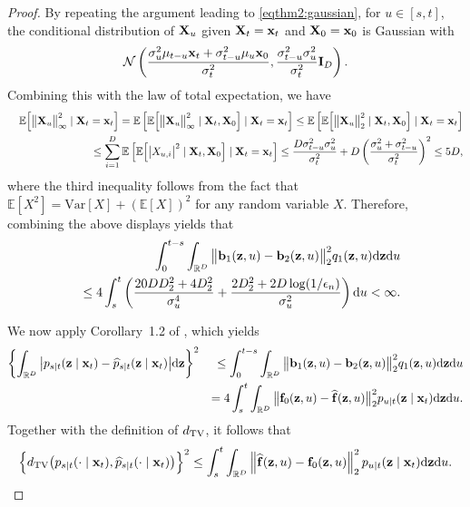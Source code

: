 \documentclass[11pt,a4paper,final]{article}
\numberwithin{equation}{section}
\theoremstyle{remark}
\def\cN{\mathcal N}
\newcommand{\bb}{{\bf b}}
\newcommand{\bff}{{\bf f}}
\newcommand{\bI}{{\bf I}}
\newcommand{\bx}{{\bf x}}
\newcommand{\bX}{{\bf X}}
\newcommand{\bz}{{\bf z}}
\newcommand{\bbE}{{\mathbb E}}
\newcommand{\bbR}{{\mathbb R}}
\newcommand{\bean}{\setlength\arraycolsep{1pt}\begin{eqnarray*}}
\newcommand{\eean}{\end{eqnarray*}}
\def\d{{\rm d}}
\begin{document}
\begin{proof}
By repeating the argument leading to \eqref{eqthm2:gaussian}, for $u \in [s,t]$, the conditional distribution of $\bX_{u}$ given $\bX_{t} = \bx_{t}$ and $\bX_{0} = \bx_{0}$ is Gaussian with  
\bean
\cN
\left( \frac{ \sigma_{u}^2 \mu_{t-u} \bx_{t} + \sigma_{t-u}^2 \mu_{u} \bx_{0 } }{\sigma_{t}^2}  , \frac{ \sigma_{t-u}^2 \sigma_{u}^2 }{\sigma_{t}^2} \bI_{D}
\right).
\eean
Combining this with the law of total expectation, we have
\bean
&& \bbE \Big[
\big\|  \bX_{u} \big\|_{\infty}^2 \mid \bX_{t} = \bx_{t} \Big]
=
\bbE \left[ \bbE \Big[
\big\|  \bX_{u} \big\|_{\infty}^2 \mid \bX_{t}, \bX_{0} \Big] \mid \bX_{t} = \bx_{t} \right]
\leq \bbE \left[ \bbE \Big[
\big\|  \bX_{u} \big\|_{2}^2 \mid \bX_{t}, \bX_{0} \Big] \mid \bX_{t} = \bx_{t} \right]
\\
&& \leq \sum_{i=1}^{D} \bbE \left[ \bbE \Big[
\big\vert  X_{u,i} \big\vert^2 \mid \bX_{t}, \bX_{0} \Big] \mid \bX_{t} = \bx_{t} \right]
\leq \frac{ D \sigma_{t-u}^2 \sigma_{u}^2 }{\sigma_{t}^2} + D \left( \frac{ \sigma_{u}^2 + \sigma_{t-u}^2 }{\sigma_{t}^2}  \right)^2 \leq 5D,
\eean
where the third inequality follows from the fact that $\bbE[ X^2] = \text{Var}[X] + ( \bbE[X] )^2$ for any random variable $X$.
Therefore, combining the above displays yields that
\bean
&& \int_{0}^{t-s}
\int_{\bbR^{D}} 
\big\| \bb_{1}(\bz,u) - \bb_{2}(\bz,u) \big\|_2^2 q_1(\bz,u)
\d \bz \d u
\\
&& \leq 4 \int_{s}^{t} \left( \frac{20 D D_{2}^2 + 4 D_{2}^2   }{\sigma_{u}^4}  + \frac{2 D_{2}^2 + 2 D \log (1/\epsilon_n) }{\sigma_{u}^2} \right) \d u < \infty.
\eean

We now apply Corollary~1.2 of \cite{bogachev2016distances}, which yields
\bean
\left\{ \int_{\bbR^{D}} \big\vert p_{s \mid t} (\bz \mid \bx_{t} ) - \widehat p_{s \mid t} ( \bz \mid \bx_{t} ) \big\vert \d \bz \right\}^2
&& \leq \int_{0}^{t-s}
\int_{\bbR^{D}} 
\big\| \bb_{1}(\bz,u) - \bb_{2}(\bz,u) \big\|_2^2 q_1(\bz,u)
\d \bz \d u
\\
&& = 4 \int_{s}^{t}
\int_{\bbR^{D}} 
\big\| \bff_{0}(\bz,u) - \widehat \bff(\bz,u) \big\|_2^2 p_{u\mid t}(\bz \mid \bx_{t})
\d \bz \d u.
\eean
Together with the definition of $d_{\rm TV}$, it follows that
\bean
 \Big\{ d_{\rm TV} \big( p_{ s \mid t}(\cdot \mid \bx_{t}), \widehat p_{ s \mid t}(\cdot \mid \bx_{t}) \big) \Big\}^2
\leq 
 \int_{s}^{t} \int_{\bbR^{D}}  \left\| \widehat \bff (\bz,u) - \bff_0 (\bz, u) \right\|_2^2 p_{u \mid t}(\bz \mid \bx_{t}) \d \bz \d u.
\eean


\end{proof}
\end{document}
